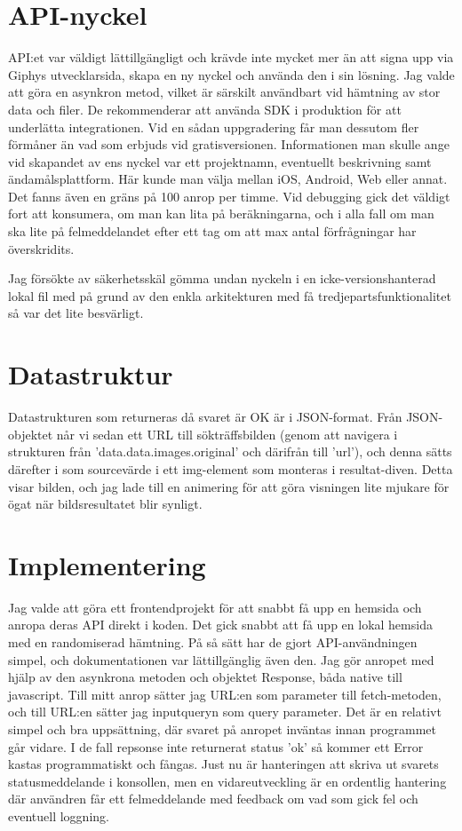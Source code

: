 \documentclass[12pt, letterpaper]{article}
\begin{document}
\section{API-nyckel}
API:et var väldigt lättillgängligt och krävde inte mycket mer än att signa upp via Giphys utvecklarsida, skapa en ny nyckel och använda den i sin lösning. Jag valde att göra en asynkron metod, vilket är särskilt användbart vid hämtning av stor data och filer. De rekommenderar att använda SDK i produktion för att underlätta integrationen. Vid en sådan uppgradering får man dessutom fler förmåner än vad som erbjuds vid gratisversionen. Informationen man skulle ange vid skapandet av ens nyckel var ett projektnamn, eventuellt beskrivning samt ändamålsplattform. Här kunde man välja mellan iOS, Android, Web eller annat. Det fanns även en gräns på 100 anrop per timme. Vid debugging gick det väldigt fort att konsumera, om man kan lita på beräkningarna, och i alla fall om man ska lite på felmeddelandet efter ett tag om att max antal förfrågningar har överskridits.

Jag försökte av säkerhetsskäl gömma undan nyckeln i en icke-versionshanterad lokal fil med på grund av den enkla arkitekturen med få tredjepartsfunktionalitet så var det lite besvärligt.

\section{Datastruktur}
Datastrukturen som returneras då svaret är OK är i JSON-format. Från JSON-objektet når vi sedan ett URL till sökträffsbilden (genom att navigera i strukturen från 'data.data.images.original' och därifrån till 'url'), och denna sätts därefter i som sourcevärde i ett img-element som monteras i resultat-diven. Detta visar bilden, och jag lade till en animering för att göra visningen lite mjukare för ögat när bildsresultatet blir synligt.  

\section{Implementering}
Jag valde att göra ett frontendprojekt för att snabbt få upp en hemsida och anropa deras API direkt i koden. Det gick snabbt att få upp en lokal hemsida med en randomiserad hämtning. På så sätt har de gjort API-användningen simpel, och dokumentationen var lättillgänglig även den. Jag gör anropet med hjälp av den asynkrona metoden och objektet Response, båda native till javascript. Till mitt anrop sätter jag URL:en som parameter till fetch-metoden, och till URL:en sätter jag inputqueryn som query parameter. Det är en relativt simpel och bra uppsättning, där svaret på anropet inväntas innan programmet går vidare. I de fall repsonse inte returnerat status 'ok' så kommer ett Error kastas programmatiskt och fångas. Just nu är hanteringen att skriva ut svarets statusmeddelande i konsollen, men en vidareutveckling är en ordentlig hantering där användren får ett felmeddelande med feedback om vad som gick fel och eventuell loggning. 
\end{document}
